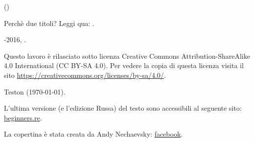 ﻿\begin{titlepage}


\end{titlepage}

\newpage

\begin{center}
\vspace*{\fill}
{\LARGE \TitleMain}

\bigskip

{\large (\TitleAux)}

\bigskip
\bigskip
Perchè due titoli? Leggi qua: .

\vspace*{\fill}

{\large \AUTHOR}

{\large \TT{<\EMAIL>}}
\vspace*{\fill}
\vfill

\ccbysa

-2016, \AUTHOR.

Questo lavoro è rilasciato sotto licenza Creative Commons Attribution-ShareAlike 4.0 International (CC BY-SA 4.0).
Per vedere la copia di questa licenza visita il sito \url{https://creativecommons.org/licenses/by-sa/4.0/}.

Teston ({\large \today}).

L'ultima versione (e l'edizione Russa) del testo sono accessibili al seguente sito: \href{http://go.yurichev.com/17009}{beginners.re}.

La copertina è stata creata da Andy Nechaevsky: \href{http://go.yurichev.com/17023}{facebook}.

\end{center}

